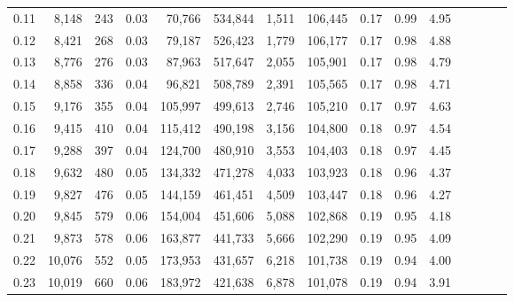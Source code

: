 \begin{tabular}{rrrcrrrrrrrrrrr}
0.11 &   8,148 &    243 &                                       0.03 &   70,766 &  534,844 &    1,511 &  106,445 &  0.17 &  0.99 &                         4.95 \\
0.12 &   8,421 &    268 &                                       0.03 &   79,187 &  526,423 &    1,779 &  106,177 &  0.17 &  0.98 &                         4.88 \\
0.13 &   8,776 &    276 &                                       0.03 &   87,963 &  517,647 &    2,055 &  105,901 &  0.17 &  0.98 &                         4.79 \\
0.14 &   8,858 &    336 &                                       0.04 &   96,821 &  508,789 &    2,391 &  105,565 &  0.17 &  0.98 &                         4.71 \\
0.15 &   9,176 &    355 &                                       0.04 &  105,997 &  499,613 &    2,746 &  105,210 &  0.17 &  0.97 &                         4.63 \\
0.16 &   9,415 &    410 &                                       0.04 &  115,412 &  490,198 &    3,156 &  104,800 &  0.18 &  0.97 &                         4.54 \\
0.17 &   9,288 &    397 &                                       0.04 &  124,700 &  480,910 &    3,553 &  104,403 &  0.18 &  0.97 &                         4.45 \\
0.18 &   9,632 &    480 &                                       0.05 &  134,332 &  471,278 &    4,033 &  103,923 &  0.18 &  0.96 &                         4.37 \\
0.19 &   9,827 &    476 &                                       0.05 &  144,159 &  461,451 &    4,509 &  103,447 &  0.18 &  0.96 &                         4.27 \\
0.20 &   9,845 &    579 &                                       0.06 &  154,004 &  451,606 &    5,088 &  102,868 &  0.19 &  0.95 &                         4.18 \\
0.21 &   9,873 &    578 &                                       0.06 &  163,877 &  441,733 &    5,666 &  102,290 &  0.19 &  0.95 &                         4.09 \\
0.22 &  10,076 &    552 &                                       0.05 &  173,953 &  431,657 &    6,218 &  101,738 &  0.19 &  0.94 &                         4.00 \\
0.23 &  10,019 &    660 &                                       0.06 &  183,972 &  421,638 &    6,878 &  101,078 &  0.19 &  0.94 &                         3.91 \\

\end{tabular}

